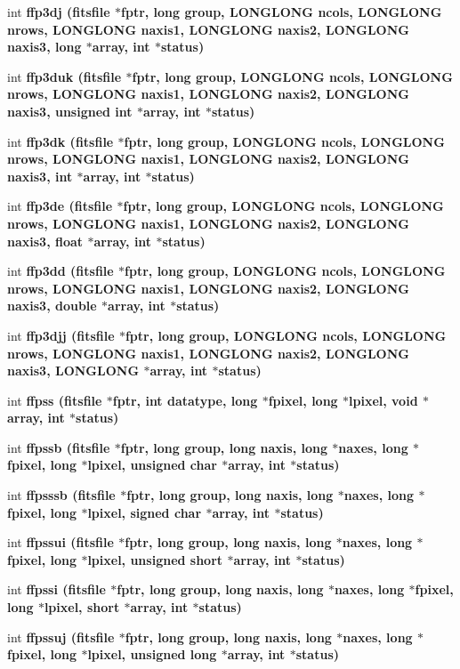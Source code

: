 \begin{CompactItemize}
\item 
int \bf{ffp3dj} (\bf{fitsfile} $\ast$fptr, long group, \bf{LONGLONG} ncols, \bf{LONGLONG} nrows, \bf{LONGLONG} naxis1, \bf{LONGLONG} naxis2, \bf{LONGLONG} naxis3, long $\ast$array, int $\ast$status)
\item 
int \bf{ffp3duk} (\bf{fitsfile} $\ast$fptr, long group, \bf{LONGLONG} ncols, \bf{LONGLONG} nrows, \bf{LONGLONG} naxis1, \bf{LONGLONG} naxis2, \bf{LONGLONG} naxis3, unsigned int $\ast$array, int $\ast$status)
\item 
int \bf{ffp3dk} (\bf{fitsfile} $\ast$fptr, long group, \bf{LONGLONG} ncols, \bf{LONGLONG} nrows, \bf{LONGLONG} naxis1, \bf{LONGLONG} naxis2, \bf{LONGLONG} naxis3, int $\ast$array, int $\ast$status)
\item 
int \bf{ffp3de} (\bf{fitsfile} $\ast$fptr, long group, \bf{LONGLONG} ncols, \bf{LONGLONG} nrows, \bf{LONGLONG} naxis1, \bf{LONGLONG} naxis2, \bf{LONGLONG} naxis3, float $\ast$array, int $\ast$status)
\item 
int \bf{ffp3dd} (\bf{fitsfile} $\ast$fptr, long group, \bf{LONGLONG} ncols, \bf{LONGLONG} nrows, \bf{LONGLONG} naxis1, \bf{LONGLONG} naxis2, \bf{LONGLONG} naxis3, double $\ast$array, int $\ast$status)
\item 
int \bf{ffp3djj} (\bf{fitsfile} $\ast$fptr, long group, \bf{LONGLONG} ncols, \bf{LONGLONG} nrows, \bf{LONGLONG} naxis1, \bf{LONGLONG} naxis2, \bf{LONGLONG} naxis3, \bf{LONGLONG} $\ast$array, int $\ast$status)
\item 
int \bf{ffpss} (\bf{fitsfile} $\ast$fptr, int \bf{datatype}, long $\ast$fpixel, long $\ast$lpixel, void $\ast$array, int $\ast$status)
\item 
int \bf{ffpssb} (\bf{fitsfile} $\ast$fptr, long group, long naxis, long $\ast$naxes, long $\ast$fpixel, long $\ast$lpixel, unsigned char $\ast$array, int $\ast$status)
\item 
int \bf{ffpsssb} (\bf{fitsfile} $\ast$fptr, long group, long naxis, long $\ast$naxes, long $\ast$fpixel, long $\ast$lpixel, signed char $\ast$array, int $\ast$status)
\item 
int \bf{ffpssui} (\bf{fitsfile} $\ast$fptr, long group, long naxis, long $\ast$naxes, long $\ast$fpixel, long $\ast$lpixel, unsigned short $\ast$array, int $\ast$status)
\item 
int \bf{ffpssi} (\bf{fitsfile} $\ast$fptr, long group, long naxis, long $\ast$naxes, long $\ast$fpixel, long $\ast$lpixel, short $\ast$array, int $\ast$status)
\item 
int \bf{ffpssuj} (\bf{fitsfile} $\ast$fptr, long group, long naxis, long $\ast$naxes, long $\ast$fpixel, long $\ast$lpixel, unsigned long $\ast$array, int $\ast$status)

\end{CompactItemize}
